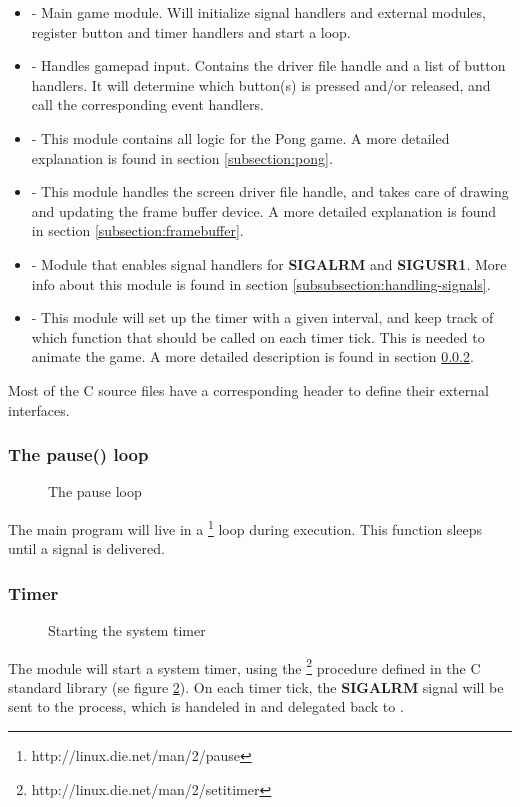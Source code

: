 \begin{itemize}
	\item {} - Main game module. Will initialize signal handlers and external modules, register button and timer handlers and start a  loop. 
	\item {} - Handles gamepad input. Contains the driver file handle and a list of button handlers. It will determine which button(s) is pressed and/or released, and call the corresponding event handlers.
	\item {} - This module contains all logic for the Pong game. A more detailed explanation is found in section \ref{subsection:pong}.
	\item {} - This module handles the screen driver file handle, and takes care of drawing and updating the frame buffer device. A more detailed explanation is found in section \ref{subsection:framebuffer}.
	\item {} - Module that enables signal handlers for \textbf{SIGALRM} and \textbf{SIGUSR1}. More info about this module is found in section \ref{subsubsection:handling-signals}.
	\item {} - This module will set up the timer with a given interval, and keep track of which function that should be called on each timer tick. This is needed to animate the game. A more detailed description is found in section \ref{subsubsection:timer}.
\end{itemize}

Most of the C source files have a corresponding header to define their external interfaces.

\subsubsection{The pause() loop}
\begin{figure}[h]
	\centering
	
	\caption{The pause loop}
	\label{fig:pause-loop}
\end{figure}
The main program will live in a \footnote{http://linux.die.net/man/2/pause} loop during execution. This function sleeps until a signal is delivered.

\subsubsection{Timer}
\label{subsubsection:timer}
\begin{figure}[h]
	\centering
	
	\caption{Starting the system timer}
	\label{fig:setitimer}
\end{figure}
The  module will start a system timer, using the \footnote{http://linux.die.net/man/2/setitimer} procedure defined in the C standard library (se figure \ref{fig:setitimer}). On each timer tick, the \textbf{SIGALRM} signal will be sent to the process, which is handeled in  and delegated back to .

